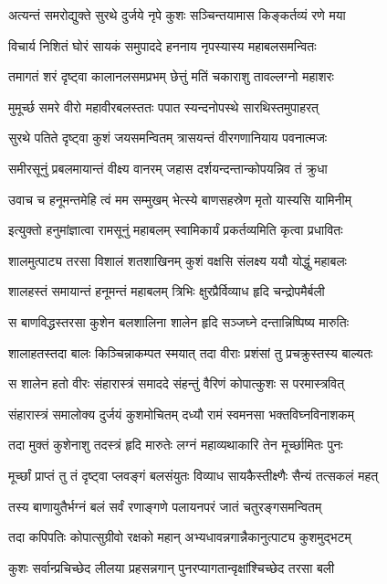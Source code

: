 \twolineshloka
{अत्यन्तं समरोद्युक्ते सुरथे दुर्जये नृपे}
{कुशः सञ्चिन्तयामास किङ्कर्तव्यं रणे मया}%

\twolineshloka
{विचार्य निशितं घोरं सायकं समुपाददे}
{हननाय नृपस्यास्य महाबलसमन्वितः}%

\twolineshloka
{तमागतं शरं दृष्ट्वा कालानलसमप्रभम्}
{छेत्तुं मतिं चकाराशु तावल्लग्नो महाशरः}%

\twolineshloka
{मुमूर्च्छ समरे वीरो महावीरबलस्ततः}
{पपात स्यन्दनोपस्थे सारथिस्तमुपाहरत्}%

\twolineshloka
{सुरथे पतिते दृष्ट्वा कुशं जयसमन्वितम्}
{त्रासयन्तं वीरगणानियाय पवनात्मजः}%

\twolineshloka
{समीरसूनुं प्रबलमायान्तं वीक्ष्य वानरम्}
{जहास दर्शयन्दन्तान्कोपयन्निव तं क्रुधा}%

\twolineshloka
{उवाच च हनूमन्तमेहि त्वं मम सम्मुखम्}
{भेत्स्ये बाणसहस्रेण मृतो यास्यसि यामिनीम्}%

\twolineshloka
{इत्युक्तो हनुमांज्ञात्वा रामसूनुं महाबलम्}
{स्वामिकार्यं प्रकर्तव्यमिति कृत्वा प्रधावितः}%

\twolineshloka
{शालमुत्पाट्य तरसा विशालं शतशाखिनम्}
{कुशं वक्षसि संलक्ष्य ययौ योद्धुं महाबलः}%

\twolineshloka
{शालहस्तं समायान्तं हनूमन्तं महाबलम्}
{त्रिभिः क्षुरप्रैर्विव्याध हृदि चन्द्रोपमैर्बली}%

\twolineshloka
{स बाणविद्धस्तरसा कुशेन बलशालिना}
{शालेन हृदि सञ्जघ्ने दन्तान्निष्पिष्य मारुतिः}%

\twolineshloka
{शालाहतस्तदा बालः किञ्चिन्नाकम्पत स्मयात्}
{तदा वीराः प्रशंसां तु प्रचक्रुस्तस्य बाल्यतः}%

\twolineshloka
{स शालेन हतो वीरः संहारास्त्रं समाददे}
{संहन्तुं वैरिणं कोपात्कुशः स परमास्त्रवित्}%

\twolineshloka
{संहारास्त्रं समालोक्य दुर्जयं कुशमोचितम्}
{दध्यौ रामं स्वमनसा भक्तविघ्नविनाशकम्}%

\twolineshloka
{तदा मुक्तं कुशेनाशु तदस्त्रं हृदि मारुतेः}
{लग्नं महाव्यथाकारि तेन मूर्च्छामितः पुनः}%

\twolineshloka
{मूर्च्छां प्राप्तं तु तं दृष्ट्वा प्लवङ्गं बलसंयुतः}
{विव्याध सायकैस्तीक्ष्णैः सैन्यं तत्सकलं महत्}%

\twolineshloka
{तस्य बाणायुतैर्भग्नं बलं सर्वं रणाङ्गणे}
{पलायनपरं जातं चतुरङ्गसमन्वितम्}%

\twolineshloka
{तदा कपिपतिः कोपात्सुग्रीवो रक्षको महान्}
{अभ्यधावन्नगान्नैकानुत्पाट्य कुशमुद्भटम्}%

\twolineshloka
{कुशः सर्वान्प्रचिच्छेद लीलया प्रहसन्नगान्}
{पुनरप्यागतान्वृक्षांश्चिच्छेद तरसा बली}%

